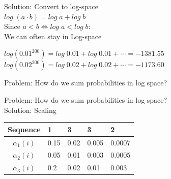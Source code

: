 \begin{frame}
\center
Solution: Convert to log-space\\
$log \; (a \cdot b) = log \; a + log \; b$\\
\vspace{20pt}
Since $a < b \iff log \; a < log \; b$:\\
\vspace{20pt} 
We can often stay in Log-space
\end{frame}

\begin{frame}
\center
$log (0.01^{200}) = log \; 0.01 + log \; 0.01 + \cdots = -1381.55$\\
\vspace{20pt}
$log (0.02^{200}) = log \; 0.02 + log \; 0.02 + \cdots = -1173.60$
\end{frame}

\begin{frame}
\center
Problem: How do we sum probabilities in log space?
\end{frame}

\begin{frame}
\center
Problem: How do we sum probabilities in log space?\\
\vspace{20pt}
Solution: Scaling
\end{frame}

\begin{frame}
\begin{table}[h]
\begin{tabular}{|c|l|l|l|l|}
 \hline
Sequence      & 1     & 3    & 3     & 2      \\ \hline
$\alpha_1(i)$          & 0.15  & 0.02 & 0.005 & 0.0007 \\ \hline
$\alpha_2(i)$          & 0.05  & 0.01 & 0.003 & 0.0005 \\ \hline
$\alpha_3(i)$          & 0.2   & 0.02 & 0.01  & 0.003  \\ \hline
\end{tabular}
\end{table}
\end{frame}

